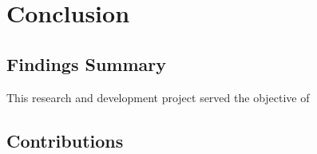 \chapter{Conclusion}\label{chap:conc}

\section{Findings Summary}
This research and development project served the objective of

\section{Contributions}

